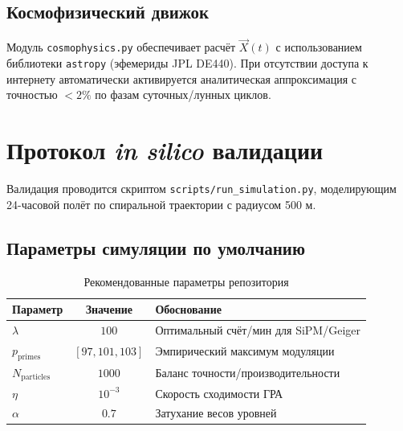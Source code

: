 \documentclass[12pt,a4paper]{article}
\newcommand{\vX}{\vec{X}}
\theoremstyle{plain}
\theoremstyle{definition}
\begin{document}
\subsection{Космофизический движок}
Модуль \texttt{cosmophysics.py} обеспечивает расчёт $\vX(t)$ с использованием библиотеки \texttt{astropy} (эфемериды JPL DE440). При отсутствии доступа к интернету автоматически активируется аналитическая аппроксимация с точностью $<2\%$ по фазам суточных/лунных циклов.

\section{Протокол \textit{in silico} валидации}
\label{sec:validation}

Валидация проводится скриптом \texttt{scripts/run\_simulation.py}, моделирующим 24-часовой полёт по спиральной траектории с радиусом 500 м.

\subsection{Параметры симуляции по умолчанию}
\begin{table}[H]
\centering
\caption{Рекомендованные параметры репозитория}
\label{tab:params}
\renewcommand{\arraystretch}{1.3}
\begin{tabular}{@{}lcp{6cm}@{}}
\toprule
\textbf{Параметр} & \textbf{Значение} & \textbf{Обоснование} \\
\midrule
$\lambda$ & $100$ & Оптимальный счёт/мин для SiPM/Geiger \\
\addlinespace
$p_{\text{primes}}$ & $[97, 101, 103]$ & Эмпирический максимум модуляции \\
\addlinespace
$N_{\text{particles}}$ & $1000$ & Баланс точности/производительности \\
\addlinespace
$\eta$ & $10^{-3}$ & Скорость сходимости ГРА \\
\addlinespace
$\alpha$ & $0.7$ & Затухание весов уровней \\
\bottomrule
\end{tabular}
\end{table}
\end{document}
